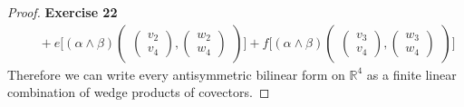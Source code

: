 \documentclass[11pt]{article}
\newcommand{\R}{\mathbb{R}}
\theoremstyle{definition}
\begin{document}
\begin{proof}{\textbf{Exercise 22}}
\begin{align*}
        &\quad + e\bigg[(\alpha\wedge\beta)\begin{pmatrix}
            \begin{pmatrix} v_2\\ v_4 \end{pmatrix},
            \begin{pmatrix} w_2\\ w_4 \end{pmatrix}
        \end{pmatrix}\bigg] + f\bigg[(\alpha\wedge\beta)\begin{pmatrix}
            \begin{pmatrix} v_3\\ v_4 \end{pmatrix},
            \begin{pmatrix} w_3\\ w_4 \end{pmatrix}
        \end{pmatrix}\bigg]
    \end{align*}
    Therefore we can write every antisymmetric bilinear form on $\R^4$ as
    a finite linear combination of wedge products of covectors.
\end{proof}
\cleardoublepage
\end{document}
